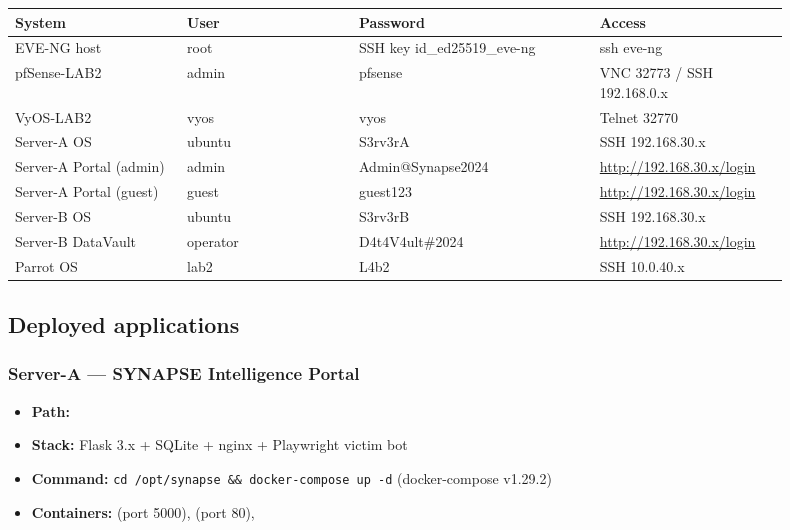{\footnotesize\begin{longtable}[]{@{}
  >{\raggedright\arraybackslash}p{0.20\linewidth}
  >{\raggedright\arraybackslash}p{0.20\linewidth}
  >{\raggedright\arraybackslash}p{0.28\linewidth}
  >{\raggedright\arraybackslash}p{0.22\linewidth}@{}}
\toprule\noalign{}
\begin{minipage}[b]{\linewidth}\raggedright
System
\end{minipage} & \begin{minipage}[b]{\linewidth}\raggedright
User
\end{minipage} & \begin{minipage}[b]{\linewidth}\raggedright
Password
\end{minipage} & \begin{minipage}[b]{\linewidth}\raggedright
Access
\end{minipage} \\
\midrule\noalign{}
\endhead
\bottomrule\noalign{}
\endlastfoot
EVE-NG host & root & SSH key id\_ed25519\_eve-ng & ssh eve-ng \\
pfSense-LAB2 & admin & pfsense & VNC 32773 / SSH 192.168.0.x \\
VyOS-LAB2 & vyos & vyos & Telnet 32770 \\
Server-A OS & ubuntu & S3rv3rA & SSH 192.168.30.x \\
Server-A Portal (admin) & admin & Admin@Synapse2024 & \url{http://192.168.30.x/login} \\
Server-A Portal (guest) & guest & guest123 & \url{http://192.168.30.x/login} \\
Server-B OS & ubuntu & S3rv3rB & SSH 192.168.30.x \\
Server-B DataVault & operator & D4t4V4ult\#2024 & \url{http://192.168.30.x/login} \\
Parrot OS & lab2 & L4b2 & SSH 10.0.40.x \\
\end{longtable}}

\subsection{Deployed applications}

\subsubsection{Server-A --- SYNAPSE Intelligence Portal}

\begin{itemize}
\tightlist
\item
  \textbf{Path:} 
\item
  \textbf{Stack:} Flask 3.x + SQLite + nginx + Playwright victim bot
\item
  \textbf{Command:} \texttt{cd\ /opt/synapse\ \&\&\ docker-compose\ up\ -d} (docker-compose v1.29.2)
\item
  \textbf{Containers:}  (port 5000),  (port 80), 
\end{itemize}

